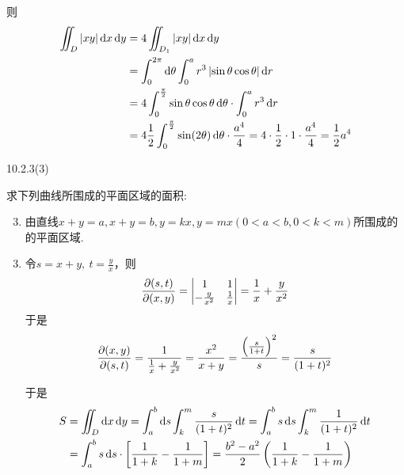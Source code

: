 \begin{solution}
\begin{enumerate}
        则
        \begin{align*}
        \iint_D |xy| \dif x \dif y 
        &= 4 \iint_{D_1} \abs{xy} \dif x \dif y \\
        &= \int_0^{2 \pi} \dif \theta \int_0^a r^3 \left| \sin\theta \cos\theta \right| \dif r \\
        &= 4\int_0^{\frac{\pi}{2}} \sin\theta \cos\theta \dif \theta \cdot \int_0^a r^3 \dif r \\
        &= 4\frac{1}{2} \int_0^{\frac{\pi}{2}} \sin(2\theta) \dif \theta \cdot \frac{a^4}{4} 
        = 4 \cdot \frac{1}{2}\cdot 1 \cdot \frac{a^4}{4} = \frac{1}{2} a^4
        \end{align*}
    \end{enumerate}
\end{solution}

\begin{exercise}
    {10.2.3(3)}

    求下列曲线所围成的平面区域的面积:
    \begin{enumerate}
        \setcounter{enumi}{2}
        \item 由直线$x+y=a,x+y=b,y=kx,y=mx (0<a<b,0<k<m)$所围成的的平面区域.
    \end{enumerate}
\end{exercise}

\begin{solution}
    \begin{enumerate}
        \setcounter{enumi}{2}
        \item 令$s = x + y,\  t = \frac{y}{x}$，则
        $$
        \pdv{(s,t)}{(x,y)} =
        \begin{vmatrix}
            1 & 1 \\
            -\frac{y}{x^2} & \frac{1}{x}
        \end{vmatrix} = \frac{1}{x} + \frac{y}{x^2}
        $$
        于是
        $$
        \pdv{(x,y)}{(s,t)} =
        \frac{1}{\frac{1}{x} + \frac{y}{x^2}} =
        \frac{x^2}{x + y} = \frac{\left( \frac{s}{1+t} \right)^2}{s} = \frac{s}{(1+t)^2}
        $$

        于是
\begin{align*}
S &= \iint_D \operatorname{d\!} x \operatorname{d\!} y 
= \int_a^b \operatorname{d\!} s \int_k^m \frac{s}{(1 + t)^2} \operatorname{d\!} t 
= \int_a^b s \operatorname{d\!} s \int_k^m \frac{1}{(1 + t)^2} \operatorname{d\!} t \\
&= \int_a^b s \operatorname{d\!} s \cdot \left[ \frac{1}{1 + k} - \frac{1}{1 + m} \right] 
= \frac{b^2 - a^2}{2} \left( \frac{1}{1 + k} - \frac{1}{1 + m} \right)
\end{align*}
    \end{enumerate}
\end{solution}

